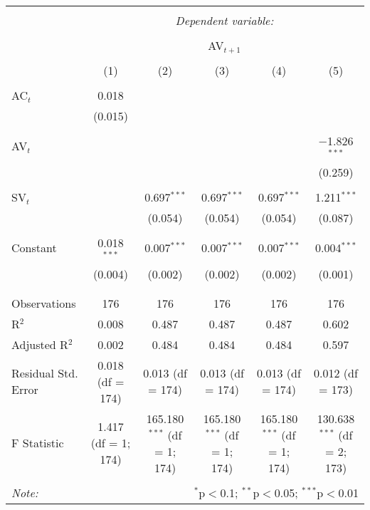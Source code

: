 
\begin{table}[!htbp] \centering 
  \caption{} 
  \label{} 
\begin{tabular}{@{\extracolsep{5pt}}lccccc} 
\\[-1.8ex]\hline 
\hline \\[-1.8ex] 
 & \multicolumn{5}{c}{\textit{Dependent variable:}} \\ 
\cline{2-6} 
\\[-1.8ex] & \multicolumn{5}{c}{AV$_{t+1}$} \\ 
\\[-1.8ex] & (1) & (2) & (3) & (4) & (5)\\ 
\hline \\[-1.8ex] 
 AC$_{t}$ & 0.018 &  &  &  &  \\ 
  & (0.015) &  &  &  &  \\ 
  & & & & & \\ 
 AV$_{t}$ &  &  &  &  & $-$1.826$^{***}$ \\ 
  &  &  &  &  & (0.259) \\ 
  & & & & & \\ 
 SV$_{t}$ &  & 0.697$^{***}$ & 0.697$^{***}$ & 0.697$^{***}$ & 1.211$^{***}$ \\ 
  &  & (0.054) & (0.054) & (0.054) & (0.087) \\ 
  & & & & & \\ 
 Constant & 0.018$^{***}$ & 0.007$^{***}$ & 0.007$^{***}$ & 0.007$^{***}$ & 0.004$^{***}$ \\ 
  & (0.004) & (0.002) & (0.002) & (0.002) & (0.001) \\ 
  & & & & & \\ 
\hline \\[-1.8ex] 
Observations & 176 & 176 & 176 & 176 & 176 \\ 
R$^{2}$ & 0.008 & 0.487 & 0.487 & 0.487 & 0.602 \\ 
Adjusted R$^{2}$ & 0.002 & 0.484 & 0.484 & 0.484 & 0.597 \\ 
Residual Std. Error & 0.018 (df = 174) & 0.013 (df = 174) & 0.013 (df = 174) & 0.013 (df = 174) & 0.012 (df = 173) \\ 
F Statistic & 1.417 (df = 1; 174) & 165.180$^{***}$ (df = 1; 174) & 165.180$^{***}$ (df = 1; 174) & 165.180$^{***}$ (df = 1; 174) & 130.638$^{***}$ (df = 2; 173) \\ 
\hline 
\hline \\[-1.8ex] 
\textit{Note:}  & \multicolumn{5}{r}{$^{*}$p$<$0.1; $^{**}$p$<$0.05; $^{***}$p$<$0.01} \\ 
\end{tabular} 
\end{table} 
